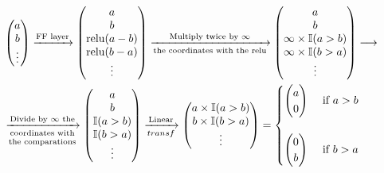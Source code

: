 \begin{align*}
    & \left( \begin{matrix} a \\ b \\ \vdots \\ \end{matrix} \right) 
    \xrightarrow{\text{FF layer}}
    \left( \begin{matrix} a \\ b \\ \text{relu}(a-b) \\ \text{relu}(b-a) \\ \vdots \\ \end{matrix} \right) 
    \xrightarrow[\text{the coordinates with the relu}]{\text{Multiply twice by $\infty$}}
    \left( \begin{matrix} a \\ b \\ \infty \times \mathbb{I}(a>b) \\ \infty \times \mathbb{I}(b>a) \\ \vdots \\ \end{matrix} \right) \longrightarrow 
    \\
    & \xrightarrow[\text{\text{\shortstack{coordinates with \\ the comparations}}}]{\text{Divide by $\infty$ the}}
    \left( \begin{matrix} a \\ b \\ \mathbb{I}(a>b) \\ \mathbb{I}(b>a) \\ \vdots \\ \end{matrix} \right)
    \xrightarrow[transf]{\text{Linear}}
    \left( \begin{matrix} a \times \mathbb{I}(a>b) \\ b \times \mathbb{I}(b>a) \\ \vdots \\ \end{matrix} \right)
    = \begin{cases}
        \left( \begin{matrix} a \\ 0 \\ \end{matrix} \right) & \text{ if } a > b \\
        \\
        \left( \begin{matrix} 0 \\ b \\ \end{matrix} \right) & \text{ if } b > a 
    \end{cases}
\end{align*}




